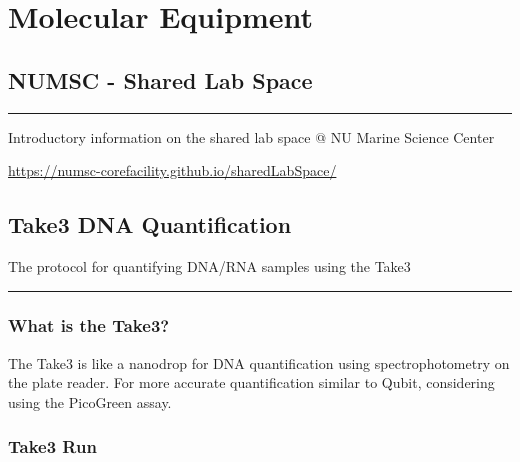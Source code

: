 \documentclass[
  letterpaper,
  DIV=11,
  numbers=noendperiod]{scrreprt}
\begin{document}
\part{Molecular Equipment}

\hypertarget{numsc---shared-lab-space}{%
\chapter{NUMSC - Shared Lab Space}\label{numsc---shared-lab-space}}

\begin{center}\rule{0.5\linewidth}{0.5pt}\end{center}

Introductory information on the shared lab space @ NU Marine Science
Center

\url{https://numsc-corefacility.github.io/sharedLabSpace/}

\hypertarget{take3-dna-quantification}{%
\chapter{Take3 DNA Quantification}\label{take3-dna-quantification}}

The protocol for quantifying DNA/RNA samples using the Take3

\begin{center}\rule{0.5\linewidth}{0.5pt}\end{center}

\hypertarget{what-is-the-take3}{%
\section*{\texorpdfstring{\textbf{What is the
Take3?}}{What is the Take3?}}\label{what-is-the-take3}}

The Take3 is like a nanodrop for DNA quantification using
spectrophotometry on the plate reader. For more accurate quantification
similar to Qubit, considering using the PicoGreen assay.

\hypertarget{take3-run}{%
\section*{\texorpdfstring{\textbf{Take3
Run}}{Take3 Run}}\label{take3-run}}
\end{document}
